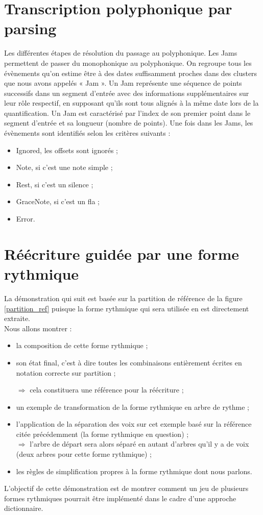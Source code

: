 \section{Transcription polyphonique par parsing}
Les différentes étapes de résolution du passage au polyphonique.
\label{jam}
Les Jams permettent de passer du monophonique au polyphonique.
On regroupe tous les évènements qu’on estime être à des dates suffisamment
proches dans des clusters que nous avons appelés « Jam ».
Un Jam représente une séquence de points successifs dans un segment d'entrée
avec des informations supplémentaires sur leur rôle respectif, en supposant
qu'ils sont tous alignés à la même date lors de la quantification. Un Jam est
caractérisé par l'index de son premier point dans le segment d'entrée et sa
longueur (nombre de points).
Une fois dans les Jams, les évènements sont identifiés selon les critères
suivants :
\begin{itemize}
    \item Ignored, les offsets sont ignorés ;
    \item Note, si c’est une note simple ;
    \item Rest, si c’est un silence ;
    \item GraceNote, si c’est un fla ;
    \item Error.
\end{itemize}

\section{Réécriture guidée par une forme rythmique}
\label{reecriture_guidee}
La démonstration qui suit est basée sur la partition de référence de la figure
\ref{partition_ref} puisque la forme rythmique qui sera utilisée en est
directement extraite.\\

Nous allons montrer :
\begin{itemize}
    \item la composition de cette forme rythmique ;
    \item son état final, c’est à dire toutes les combinaisons entièrement
        écrites en notation correcte sur partition ;

        $\Rightarrow$ cela constituera une référence pour la réécriture ;
    \item un exemple de transformation de la forme rythmique en arbre de
        rythme ;
    \item l’application de la séparation des voix sur cet exemple basé sur la
        référence citée précédemment (la forme rythmique en question) ;\\
        $\Rightarrow$ l’arbre de départ sera alors séparé en autant d’arbres
        qu’il y a de voix (deux arbres pour cette forme rythmique) ;
    \item les règles de simplification propres à la forme rythmique dont nous
        parlons. 
\end{itemize}
L’objectif de cette démonstration est de montrer comment un jeu de plusieurs
formes rythmiques pourrait être implémenté dans le cadre d’une approche
dictionnaire.

